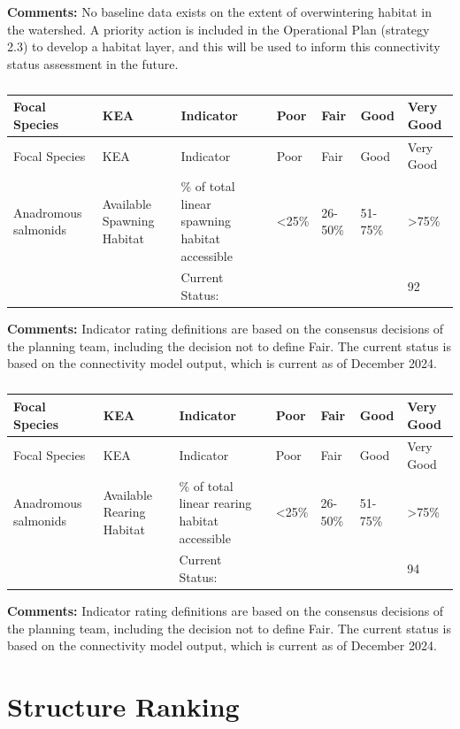 \documentclass[
  letterpaper,
  DIV=11,
  numbers=noendperiod]{scrreprt}
\begin{document}
\textbf{Comments:} No baseline data exists on the extent of
overwintering habitat in the watershed. A priority action is included in
the Operational Plan (strategy 2.3) to develop a habitat layer, and this
will be used to inform this connectivity status assessment in the
future.

\begin{longtable}[]{@{}lllllll@{}}
\caption{}\label{T_8c9d3}\tabularnewline
\toprule\noalign{}
Focal Species & KEA & Indicator & Poor & Fair & Good & Very Good \\
\midrule\noalign{}
\endfirsthead
\toprule\noalign{}
Focal Species & KEA & Indicator & Poor & Fair & Good & Very Good \\
\midrule\noalign{}
\endhead
\bottomrule\noalign{}
\endlastfoot
Anadromous salmonids & Available Spawning Habitat & \% of total linear
spawning habitat accessible & \textless25\% & 26-50\% & 51-75\% &
\textgreater75\% \\
& & Current Status: & & & & 92 \\
\end{longtable}

\textbf{Comments:} Indicator rating definitions are based on the
consensus decisions of the planning team, including the decision not to
define Fair. The current status is based on the connectivity model
output, which is current as of December 2024.

\begin{longtable}[]{@{}lllllll@{}}
\caption{}\label{T_27f74}\tabularnewline
\toprule\noalign{}
Focal Species & KEA & Indicator & Poor & Fair & Good & Very Good \\
\midrule\noalign{}
\endfirsthead
\toprule\noalign{}
Focal Species & KEA & Indicator & Poor & Fair & Good & Very Good \\
\midrule\noalign{}
\endhead
\bottomrule\noalign{}
\endlastfoot
Anadromous salmonids & Available Rearing Habitat & \% of total linear
rearing habitat accessible & \textless25\% & 26-50\% & 51-75\% &
\textgreater75\% \\
& & Current Status: & & & & 94 \\
\end{longtable}

\textbf{Comments:} Indicator rating definitions are based on the
consensus decisions of the planning team, including the decision not to
define Fair. The current status is based on the connectivity model
output, which is current as of December 2024.

\hypertarget{structure-ranking}{%
\section*{Structure Ranking}\label{structure-ranking}}
\end{document}

